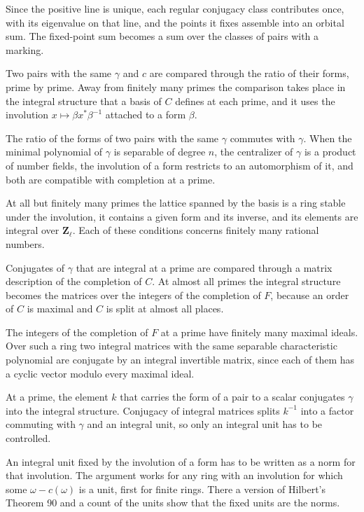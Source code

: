 Since the positive line is unique, each regular conjugacy class contributes once, with its eigenvalue
on that line, and the points it fixes assemble into an orbital sum. The fixed-point sum becomes a sum
over the classes of pairs with a marking.

Two pairs with the same $\gamma$ and $c$ are compared through the ratio of their forms, prime by prime.
Away from finitely many primes the comparison takes place in the integral structure that a basis of $C$
defines at each prime, and it uses the involution $x\mapsto\beta x^*\beta^{-1}$ attached to a form
$\beta$.

The ratio of the forms of two pairs with the same $\gamma$ commutes with $\gamma$. When the minimal
polynomial of $\gamma$ is separable of degree $n$, the centralizer of $\gamma$ is a product of number
fields, the involution of a form restricts to an automorphism of it, and both are compatible with
completion at a prime.

At all but finitely many primes the lattice spanned by the basis is a ring stable under the involution,
it contains a given form and its inverse, and its elements are integral over $\mathbf Z_\ell$. Each of
these conditions concerns finitely many rational numbers.

Conjugates of $\gamma$ that are integral at a prime are compared through a matrix description of the
completion of $C$. At almost all primes the integral structure becomes the matrices over the integers of
the completion of $F$, because an order of $C$ is maximal and $C$ is split at almost all places.

The integers of the completion of $F$ at a prime have finitely many maximal ideals. Over such a ring two
integral matrices with the same separable characteristic polynomial are conjugate by an integral
invertible matrix, since each of them has a cyclic vector modulo every maximal ideal.

At a prime, the element $k$ that carries the form of a pair to a scalar conjugates $\gamma$ into the
integral structure. Conjugacy of integral matrices splits $k^{-1}$ into a factor commuting with $\gamma$
and an integral unit, so only an integral unit has to be controlled.

An integral unit fixed by the involution of a form has to be written as a norm for that involution. The
argument works for any ring with an involution for which some $\omega-c(\omega)$ is a unit, first for
finite rings. There a version of Hilbert's Theorem 90 and a count of the units show that the fixed units
are the norms.

